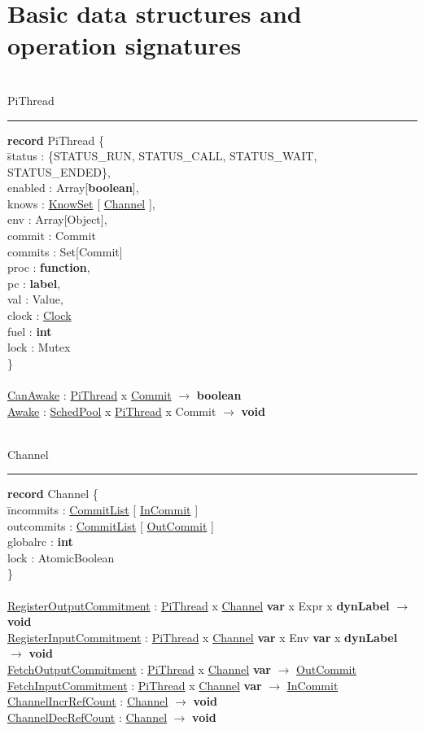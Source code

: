 \documentclass[a4paper,11pt]{article}
\newenvironment{program}{
  \begin{sffamily}
  \begin{scriptsize}
  \begin{tabbing}}
 {\end{tabbing}
  \end{scriptsize}
  \end{sffamily}}
\newcommand{\kw}[1]{\textsf{\textbf{#1}}}
\newcommand{\pindent}{\hspace{2em}\=}
\newcommand{\synchro}[1]{\textcolor{synchrocolor}{#1}}
\newcommand{\algotitle}[1]{\noindent\\ \noindent#1\par\nobreak\vspace{3pt}\hrule\vspace{6pt}}
\newcommand{\algosection}[1]{
  \phantomsection
  \algotitle{#1}
}
\newcommand{\myref}[1]{
  \hyperref[#1]{#1}
}
\begin{document}
\section{Basic data structures and operation signatures}


\label{PiThread}
\algosection{PiThread}
\begin{program}
  \kw{record} PiThread \{ \\
  \pindent status : \{STATUS\_RUN, STATUS\_CALL, STATUS\_WAIT, STATUS\_ENDED\}, \\
  \> enabled : Array[\kw{boolean}], \\
  \> knows : \myref{KnowSet}[\myref{Channel}], \\
  \> env : Array[Object], \\
  \> commit : Commit \\
  \> commits : Set[Commit] \\
  \> proc : \kw{function}, \\
  \> pc : \kw{label}, \\
  \> val : Value, \\
  \> clock : \myref{Clock} \\
  \> fuel : \kw{int} \\
  \> \synchro{lock : Mutex} \\
  \} \\ \\
  \myref{CanAwake} : \myref{PiThread} x \myref{Commit} $\rightarrow$ \kw{boolean} \\
  \myref{Awake} : \myref{SchedPool} x \myref{PiThread} x Commit $\rightarrow$ \kw{void}
\end{program}

\label{Channel}
\algosection{Channel}
\begin{program}
  \kw{record} Channel \{ \\
  \pindent incommits : \myref{CommitList}[\myref{InCommit}] \\
  \>outcommits : \myref{CommitList}[\myref{OutCommit}] \\
  \>globalrc : \kw{int} \\
  \>\synchro{lock : AtomicBoolean} \\
  \} \\ \\
  \myref{RegisterOutputCommitment} : \myref{PiThread} x \myref{Channel} \kw{var} x Expr x \kw{dynLabel} $\rightarrow$ \kw{void} \\
  \myref{RegisterInputCommitment} : \myref{PiThread} x \myref{Channel} \kw{var} x Env \kw{var} x \kw{dynLabel} $\rightarrow$ \kw{void} \\
  \myref{FetchOutputCommitment} : \myref{PiThread} x \myref{Channel} \kw{var} $\rightarrow$ \myref{OutCommit} \\
  \myref{FetchInputCommitment} : \myref{PiThread} x \myref{Channel} \kw{var} $\rightarrow$ \myref{InCommit} \\
  \myref{ChannelIncrRefCount} : \myref{Channel} $\rightarrow$ \kw{void} \\
  \myref{ChannelDecRefCount} : \myref{Channel} $\rightarrow$ \kw{void}
\end{program}
\end{document}
